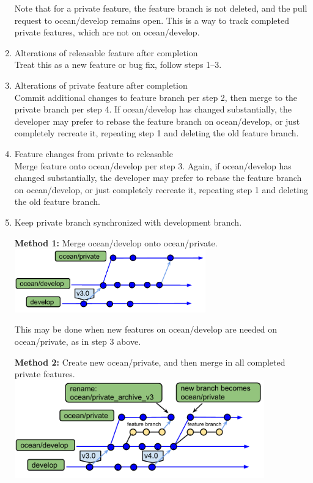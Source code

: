 \documentclass[11pt]{article}
\begin{document}
\begin{enumerate}
Note that for a private feature, the feature branch is not deleted, and the pull request to ocean/develop remains open.  This is a way to track completed private features, which are not on ocean/develop.

\item Alterations of releasable feature after completion\\
Treat this as a new feature or bug fix, follow steps 1--3.

\item Alterations of private feature after completion\\
Commit additional changes to feature branch per step 2, then merge to the private branch per step 4.  If ocean/develop has changed substantially, the developer may prefer to rebase the feature branch on ocean/develop, or just completely recreate it, repeating step 1 and deleting the old feature branch.

\item Feature changes from private to releasable \\
Merge feature onto ocean/develop per step 3.  Again, if ocean/develop has changed substantially, the developer may prefer to rebase the feature branch on ocean/develop, or just completely recreate it, repeating step 1 and deleting the old feature branch.

\clearpage
\item Keep private branch synchronized with development branch.

{\bf Method 1:} Merge ocean/develop onto ocean/private.  \\
\includegraphics[width=3.25in]{f/MPASworkflow_8a.pdf}

This may be done when new features on ocean/develop are needed on ocean/private, as in step 3 above.

{\bf Method 2:} Create new ocean/private, and then merge in all completed private features.  \\
\includegraphics[width=4.25in]{f/MPASworkflow_8b.pdf}


\end{enumerate}
\end{document}
